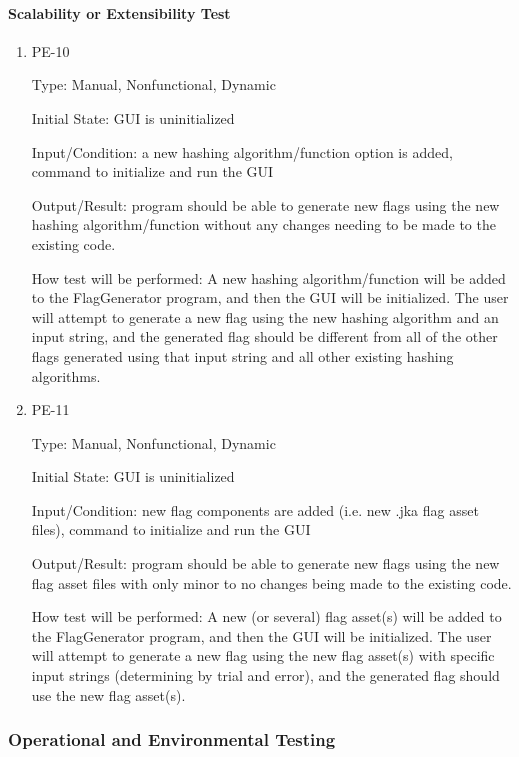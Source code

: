 \documentclass[12pt, titlepage]{article}
\begin{document}
\paragraph{Scalability or Extensibility Test}

\begin{enumerate}

\item{PE-10\\}

Type: Manual, Nonfunctional, Dynamic

Initial State: GUI is uninitialized

Input/Condition: a new hashing algorithm/function option is added, command to
initialize and run the GUI

Output/Result: program should be able to generate new flags using the new
hashing algorithm/function without any changes needing to be made to the
existing code.

How test will be performed: A new hashing algorithm/function will be added to
the FlagGenerator program, and then the GUI will be initialized. The user will
attempt to generate a new flag using the new hashing algorithm and an input
string, and the generated flag should be different from all of the other flags
generated using that input string and all other existing hashing algorithms.

\item{PE-11\\}

Type: Manual, Nonfunctional, Dynamic

Initial State: GUI is uninitialized

Input/Condition: new flag components are added (i.e. new .jka flag asset
files), command to initialize and run the GUI

Output/Result: program should be able to generate new flags using the new flag
asset files with only minor to no changes being made to the existing code.

How test will be performed: A new (or several) flag asset(s) will be added to
the FlagGenerator program, and then the GUI will be initialized. The user will
attempt to generate a new flag using the new flag asset(s) with specific input
strings (determining by trial and error), and the generated flag should use
the new flag asset(s).

\end{enumerate}

\subsubsection{Operational and Environmental Testing}
\end{document}
